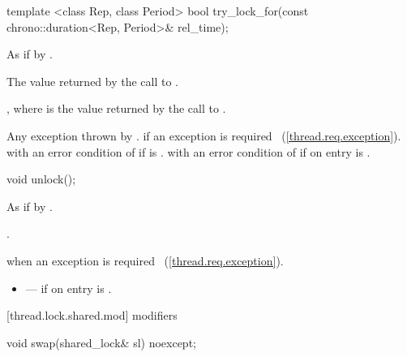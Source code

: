 %
%
\begin{itemdecl}
template <class Rep, class Period>
  bool try_lock_for(const chrono::duration<Rep, Period>& rel_time);
\end{itemdecl}

\begin{itemdescr}
\pnum
\effects As if by .

\pnum
\returns The value returned by the call to .

\pnum
\postconditions {}, where  is the value returned by the call to .

\pnum
\throws Any exception thrown by .  if an exception is required ~(\ref{thread.req.exception}).  with an error condition of  if  is .  with an error condition of  if on entry  is .
\end{itemdescr}

%
%
\begin{itemdecl}
void unlock();
\end{itemdecl}

\begin{itemdescr}
\pnum
\effects As if by .

\pnum
\postconditions {}.

\pnum
\throws {} when an exception is required ~(\ref{thread.req.exception}).

\pnum
\errors
\begin{itemize}
\item {} --- if on entry  is
.
\end{itemize}
\end{itemdescr}

[thread.lock.shared.mod]{ modifiers}

%
%
\begin{itemdecl}
void swap(shared_lock& sl) noexcept;
\end{itemdecl}

